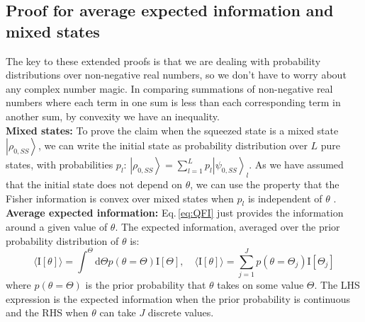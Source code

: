 \documentclass[reqno]{amsart}
\def\be{\begin{equation}}
\def\ee{\end{equation}}
\newcommand{\ket}[1]{\left| #1 \right>}
\def\func#1#2{\mathrm{#1}\left[#2\right]}
\begin{document}
\subsection{Proof for average expected information and mixed states}\label{App:Mixed}
The key to these extended proofs is that we are dealing with probability distributions over non-negative real numbers, so we don't have to worry about any complex number magic. In comparing summations of non-negative real numbers where each term in one sum is less than each corresponding term in another sum, by convexity we have an inequality.\\

\noindent \textbf{Mixed states:} To prove the claim when the squeezed state is a mixed state $\ket{\rho_{0,SS}}$, we can write the initial state as probability distribution over $L$ pure states, with probabilities $p_l$: $\ket{\rho_{0,SS}} = \sum_{l=1}^L p_l \ket{\psi_{0,SS}}_l$. As we have assumed that the initial state does not depend on $\theta$, we can use the property that the Fisher information is convex over mixed states when $p_l$ is independent of $\theta$ \cite{Liu2020}.\\




\noindent\textbf{Average expected information:} Eq.\,\eqref{eq:QFI} just provides the information around a given value of $\theta$. The expected information, averaged over the prior probability distribution of $\theta$ is:
\be \langle \func{I}{\theta}\rangle = \int^{\Theta} \mathrm{d}\Theta p(\theta=\Theta) \func{I}{\Theta}, \quad \langle \func{I}{\theta}\rangle = \sum_{j=1}^J p(\theta = \Theta_j) \func{I}{\Theta_j}
\ee
where $p(\theta = \Theta)$ is the prior probability that $\theta$ takes on some value $\Theta$. The LHS expression is the expected information when the prior probability is continuous and the RHS when $\theta$ can take $J$ discrete values.
\end{document}

